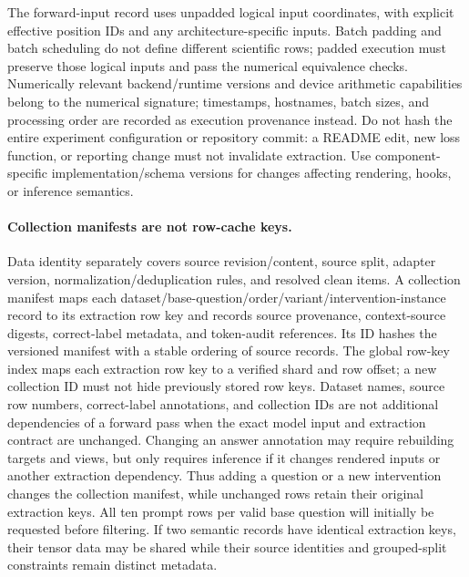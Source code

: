 \documentclass[11pt]{article}
\begin{document}
The forward-input record uses unpadded logical input coordinates, with explicit effective position IDs and any architecture-specific inputs.
Batch padding and batch scheduling do not define different scientific rows; padded execution must preserve those logical inputs and pass the numerical equivalence checks.
Numerically relevant backend/runtime versions and device arithmetic capabilities belong to the numerical signature; timestamps, hostnames, batch sizes, and processing order are recorded as execution provenance instead.
Do not hash the entire experiment configuration or repository commit: a README edit, new loss function, or reporting change must not invalidate extraction.
Use component-specific implementation/schema versions for changes affecting rendering, hooks, or inference semantics.

\paragraph{Collection manifests are not row-cache keys.}
Data identity separately covers source revision/content, source split, adapter version, normalization/deduplication rules, and resolved clean items.
A collection manifest maps each dataset/base-question/order/variant/intervention-instance record to its extraction row key and records source provenance, context-source digests, correct-label metadata, and token-audit references.
Its ID hashes the versioned manifest with a stable ordering of source records.
The global row-key index maps each extraction row key to a verified shard and row offset; a new collection ID must not hide previously stored row keys.
Dataset names, source row numbers, correct-label annotations, and collection IDs are not additional dependencies of a forward pass when the exact model input and extraction contract are unchanged.
Changing an answer annotation may require rebuilding targets and views, but only requires inference if it changes rendered inputs or another extraction dependency.
Thus adding a question or a new intervention changes the collection manifest, while unchanged rows retain their original extraction keys.
All ten prompt rows per valid base question will initially be requested before filtering.
If two semantic records have identical extraction keys, their tensor data may be shared while their source identities and grouped-split constraints remain distinct metadata.
\end{document}
